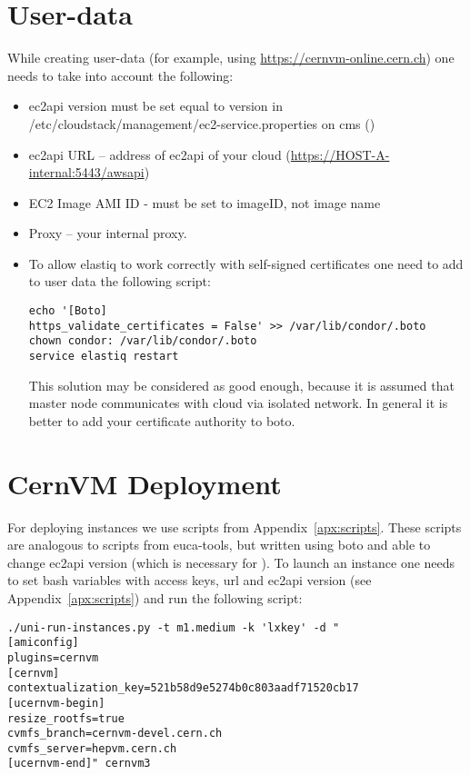 \section{User-data}
While creating user-data (for example, using \url{https://cernvm-online.cern.ch}) one needs to take into account the following:
\begin{itemize}
	\item \acrshort{ec2api} version must be set equal to version in /etc/cloudstack/management/ec2-service.properties on \acrshort{cms} ()
	\item \acrshort{ec2api} URL -- address of  \acrshort{ec2api} of your cloud (\eg \url{https://HOST-A-internal:5443/awsapi})
	\item EC2 Image AMI ID - must be set to  imageID, not image name
	\item Proxy -- your internal proxy.
	\item To allow elastiq to work correctly with self-signed certificates one need to add to user data the following script:
	\begin{lstlisting}
echo '[Boto]
https_validate_certificates = False' >> /var/lib/condor/.boto
chown condor: /var/lib/condor/.boto
service elastiq restart
	\end{lstlisting}
	This solution may be considered as good enough, because it is assumed that master node communicates with cloud via isolated network. 
	In general it is better to add your certificate authority to boto.
\end{itemize}


\section{CernVM Deployment}
For deploying \cernvm instances we use scripts from Appendix~\ref{apx:scripts}. 
These scripts are analogous to scripts from euca-tools, but written using boto and able to change \acrshort{ec2api} version (which is necessary for \cstack).
To launch an instance one needs to set bash variables with access keys, url and \acrshort{ec2api} version (see Appendix~\ref{apx:scripts}) and run the following script:
\begin{lstlisting}
./uni-run-instances.py -t m1.medium -k 'lxkey' -d "
[amiconfig]
plugins=cernvm
[cernvm]
contextualization_key=521b58d9e5274b0c803aadf71520cb17
[ucernvm-begin]
resize_rootfs=true
cvmfs_branch=cernvm-devel.cern.ch
cvmfs_server=hepvm.cern.ch
[ucernvm-end]" cernvm3
\end{lstlisting}
